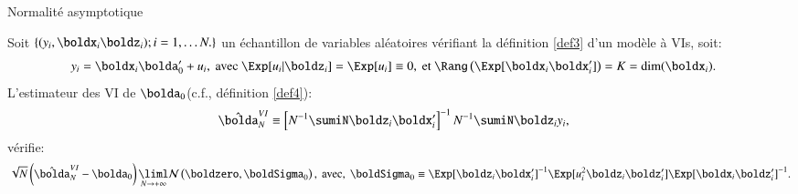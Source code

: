 \begin{frame}[allowframebreaks]{Normalité asymptotique}
    \begin{propriete}
Soit $\{(y_i, \boldx_i \boldz_i); i=1, \ldots N.\}$ un échantillon de variables
aléatoires vérifiant la définition \ref{def3} d'un modèle à VIs, soit: 
\begin{align*}
    y_i &=\boldx_i\bolda_0^\prime + u_i, \ \text{avec} \ \Exp[u_i|\boldz_i] = \Exp[u_i]\equiv 0,  
    \ \text{et} \ \Rang\left(\Exp[\boldx_i\boldx_i^\prime]\right)= K = \dim(\boldx_i).
\end{align*}
L’estimateur des VI de $\bolda_0$(c.f., définition \ref{def4}):
\begin{align*}
    \hat{\bolda}_N^{VI}&\equiv \left[N^{-1}\sumiN \boldz_i\boldx_i^\prime \right]^{-1}N^{-1}\sumiN \boldz_iy_i,
\end{align*}
vérifie:
\begin{align}
\sqrt{N}\left(\hat{\bolda}_N^{VI} - \bolda_0\right)
\underset{N\to +\infty}{\liml}\mathcal{N}\left(\boldzero,\boldSigma_0 \right),
\
\text{avec}, 
\
    \boldSigma_0 \equiv \Exp[\boldz_i\boldx_i^\prime]^{-1} \Exp[u_i^2\boldz_i\boldz_i^\prime]
    \Exp[\boldx_i\boldz_i^\prime]^{-1}.
    \label{eq9}
\end{align}
    \end{propriete}


\end{frame}
